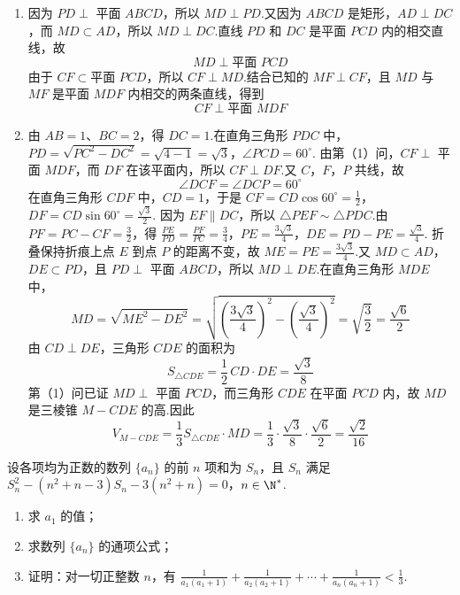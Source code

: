 \begin{solution}
\begin{enumerate}
\item 因为 \(PD\perp\) 平面 \(ABCD\)，所以 \(MD\perp PD\).又因为 \(ABCD\) 是矩形，\(AD\perp DC\)，而 \(MD\subset AD\)，所以 \(MD\perp DC\).直线 \(PD\) 和 \(DC\) 是平面 \(PCD\) 内的相交直线，故
\[
MD\perp\text{平面 }PCD
\]
由于 \(CF\subset\text{平面 }PCD\)，所以 \(CF\perp MD\).结合已知的 \(MF\perp CF\)，且 \(MD\) 与 \(MF\) 是平面 \(MDF\) 内相交的两条直线，得到
\[
CF\perp\text{平面 }MDF
\]

\item 由 \(AB=1\)、\(BC=2\)，得 \(DC=1\).在直角三角形 \(PDC\) 中，
\(PD=\sqrt{PC^2-DC^2}=\sqrt{4-1}=\sqrt{3}\)，\(\angle PCD=60^\circ\).
由第（1）问，\(CF\perp\) 平面 \(MDF\)，而 \(DF\) 在该平面内，所以 \(CF\perp DF\).又 \(C\)，\(F\)，\(P\) 共线，故
\[
\angle DCF=\angle DCP=60^\circ
\]
在直角三角形 \(CDF\) 中，\(CD=1\)，于是
\(CF=CD\cos60^\circ=\frac12\)，\(DF=CD\sin60^\circ=\frac{\sqrt3}{2}\).
因为 \(EF\parallel DC\)，所以 \(\triangle PEF\sim\triangle PDC\).由 \(PF=PC-CF=\frac32\)，得
\(\frac{PE}{PD}=\frac{PF}{PC}=\frac34\)，\(PE=\frac{3\sqrt3}{4}\)，\(DE=PD-PE=\frac{\sqrt3}{4}\).
折叠保持折痕上点 \(E\) 到点 \(P\) 的距离不变，故 \(ME=PE=\frac{3\sqrt3}{4}\).又 \(MD\subset AD\)，\(DE\subset PD\)，且 \(PD\perp\) 平面 \(ABCD\)，所以 \(MD\perp DE\).在直角三角形 \(MDE\) 中，
\[
MD=\sqrt{ME^2-DE^2}
=\sqrt{\left(\frac{3\sqrt3}{4}\right)^2-\left(\frac{\sqrt3}{4}\right)^2}
=\sqrt{\frac32}=\frac{\sqrt6}{2}
\]
由 \(CD\perp DE\)，三角形 \(CDE\) 的面积为
\[
S_{\triangle CDE}=\frac12\,CD\cdot DE=\frac{\sqrt3}{8}
\]
第（1）问已证 \(MD\perp\) 平面 \(PCD\)，而三角形 \(CDE\) 在平面 \(PCD\) 内，故 \(MD\) 是三棱锥 \(M-CDE\) 的高.因此
\[
V_{M-CDE}=\frac13S_{\triangle CDE}\cdot MD
=\frac13\cdot\frac{\sqrt3}{8}\cdot\frac{\sqrt6}{2}
=\frac{\sqrt2}{16}
\]
\end{enumerate}
\end{solution}

\begin{problem}
设各项均为正数的数列 \(\{a_{n}\}\) 的前 \(n\) 项和为 \(S_{n}\)，且 \(S_{n}\) 满足 \(S_{n}^{2} - (n^{2} + n - 3)S_{n} - 3(n^{2} + n) = 0\)，\(n \in \N^{*}\).

\begin{enumerate}
\item 求 \(a_{1}\) 的值；
\item 求数列 \(\{a_{n}\}\) 的通项公式；
\item 证明：对一切正整数 \(n\)，有 \(\frac{1}{a_1(a_1 + 1)} + \frac{1}{a_2(a_2 + 1)} + \cdots + \frac{1}{a_n(a_n + 1)} < \frac{1}{3}\).
\end{enumerate}
\end{problem}

